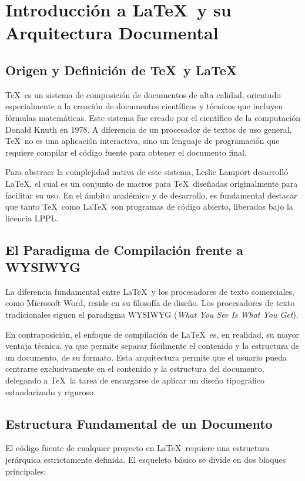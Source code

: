 \section{Introducción a \LaTeX\ y su Arquitectura Documental}

\subsection{Origen y Definición de \TeX\ y \LaTeX}
\TeX\ es un sistema de composición de documentos de alta calidad, orientado especialmente a la creación de documentos científicos y técnicos que incluyen fórmulas matemáticas. Este sistema fue creado por el científico de la computación Donald Knuth en 1978. A diferencia de un procesador de textos de uso general, \TeX\ no es una aplicación interactiva, sino un lenguaje de programación que requiere compilar el código fuente para obtener el documento final.

Para abstraer la complejidad nativa de este sistema, Leslie Lamport desarrolló \LaTeX, el cual es un conjunto de macros para \TeX\ diseñadas originalmente para facilitar su uso. En el ámbito académico y de desarrollo, es fundamental destacar que tanto \TeX\ como \LaTeX\ son programas de código abierto, liberados bajo la licencia LPPL.

\subsection{El Paradigma de Compilación frente a WYSIWYG}
La diferencia fundamental entre \LaTeX\ y los procesadores de texto comerciales, como Microsoft Word, reside en su filosofía de diseño. Los procesadores de texto tradicionales siguen el paradigma WYSIWYG (\textit{What You See Is What You Get}). 

En contraposición, el enfoque de compilación de \LaTeX\ es, en realidad, su mayor ventaja técnica, ya que permite separar fácilmente el contenido y la estructura de un documento, de su formato. Esta arquitectura permite que el usuario pueda centrarse exclusivamente en el contenido y la estructura del documento, delegando a \TeX\ la tarea de encargarse de aplicar un diseño tipográfico estandarizado y riguroso.

\subsection{Estructura Fundamental de un Documento}
El código fuente de cualquier proyecto en \LaTeX\ requiere una estructura jerárquica estrictamente definida. El esqueleto básico se divide en dos bloques principales:

